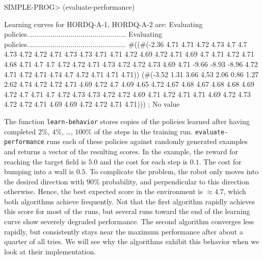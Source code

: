 \documentclass[a4paper]{amsart}
\begin{document}
\begin{Code}
  SIMPLE-PROG> (evaluate-performance)

  Learning curves for HORDQ-A-1, HORDQ-A-2 are:
  Evaluating policies..................................................
  Evaluating policies..................................................
  #((#(-2.36 4.71 4.71 4.72 4.73 4.7 4.7
       4.73 4.72 4.72 4.71 4.73 4.73 4.71
       4.71 4.72 4.69 4.72 4.71 4.69 4.7
       4.71 4.72 4.71 4.68 4.71 4.7 4.7
       4.72 4.72 4.71 4.73 4.72 4.72 4.73
       4.69 4.71 -9.66 -8.93 -8.96 4.72
       4.71 4.72 4.71 4.74 4.7 4.72 4.71 4.71 4.71))
    (#(-3.52 1.31 3.66 4.53 2.06 0.86 1.27
       2.62 4.74 4.72 4.72 4.71 4.69
       4.72 4.7 4.69 4.65 4.72 4.67 4.68
       4.67 4.68 4.68 4.69 4.72 4.7 4.71
       4.7 4.72 4.73 4.73 4.72 4.72 4.69
       4.71 4.72 4.71 4.71 4.69 4.72 4.73
       4.72 4.72 4.71 4.69 4.69 4.72 4.72 4.71 4.71)))
  ; No value
\end{Code}
The function \texttt{learn-behavior} stores copies of the policies
learned after having completed $2\%$, $4\%$, \dots, $100\%$ of the
steps in the training run.  \texttt{evaluate-performance} runs each of
these policies against randomly generated examples and returns a
vector of the resulting scores.  In the example, the reward for
reaching the target field is $5.0$ and the cost for each step is
$0.1$.  The cost for bumping into a wall is $0.5$.  To complicate the
problem, the robot only moves into the desired direction with $90\%$
probability, and perpendicular to this direction otherwise.  Hence,
the best expected score in the environment is $\approx4.7$, which
both algorithms achieve frequently.  Not that the first algorithm
rapidly achieves this score for most of the runs, but several runs
toward the end of the learning curve show severely degraded
performance.  The second algorithm converges less rapidly, but
consistently stays near the maximum performance after about a quarter
of all tries.  We will see why the algorithms exhibit this behavior
when we look at their implementation.
\end{document}
